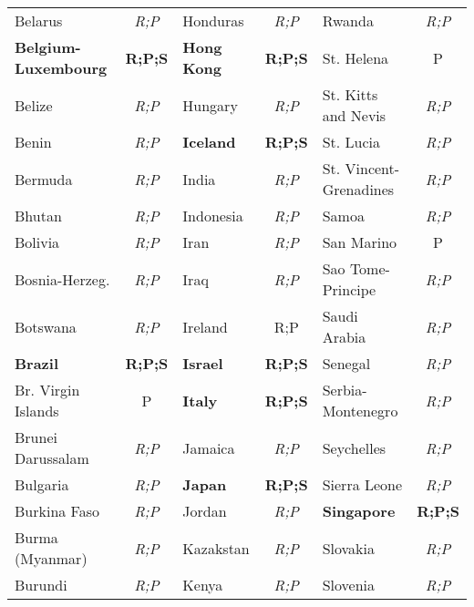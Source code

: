 \documentclass[12pt,twoside,a4paper,notitlepage]{article}
\begin{document}
{\begin{table}
\begin{tabular}{|l|c|l|c|l|c|}
   Belarus &  {\it R;P} &   Honduras &  {\it R;P} &     Rwanda &  {\it R;P} \\

  \bf Belgium-Luxembourg &  {\bf R;P;S} & \bf Hong Kong &  {\bf R;P;S} & St. Helena &          P \\

    Belize &  {\it R;P} &    Hungary &  {\it R;P} & St. Kitts and Nevis &  {\it R;P} \\

     Benin &  {\it R;P} &  \bf Iceland &  {\bf R;P;S} &  St. Lucia &  {\it R;P} \\

   Bermuda &  {\it R;P} &      India &  {\it R;P} & St. Vincent-Grenadines &  {\it R;P} \\

    Bhutan &  {\it R;P} &  Indonesia &  {\it R;P} &      Samoa &  {\it R;P} \\

   Bolivia &  {\it R;P} &       Iran &  {\it R;P} & San Marino &          P \\

Bosnia-Herzeg. &  {\it R;P} &       Iraq &  {\it R;P} & Sao Tome-Principe &  {\it R;P} \\

  Botswana &  {\it R;P} &   Ireland &  {R;P} & Saudi Arabia &  {\it R;P} \\

  \bf Brazil &  {\bf R;P;S} &  \bf Israel &  {\bf R;P;S} &    Senegal &  {\it R;P} \\

Br. Virgin Islands &          P &   \bf Italy &  {\bf R;P;S} & Serbia-Montenegro &  {\it R;P} \\

Brunei Darussalam &  {\it R;P} &    Jamaica &  {\it R;P} & Seychelles &  {\it R;P} \\

  Bulgaria &  {\it R;P} &   \bf Japan &  {\bf R;P;S} & Sierra Leone &  {\it R;P} \\
  
Burkina Faso &  {\it R;P} &     Jordan &  {\it R;P} & \bf Singapore &  {\bf R;P;S} \\

 Burma (Myanmar)   & {\it R;P}  &  Kazakstan &  {\it R;P} &   Slovakia &  {\it R;P} \\

   Burundi &  {\it R;P} &      Kenya &  {\it R;P} &   Slovenia &  {\it R;P} \\
  

\end{tabular}
\end{table}}
\end{document}
